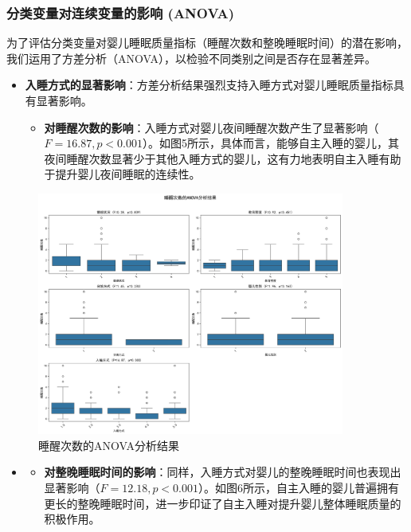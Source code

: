\documentclass[withoutpreface,bwprint]{cumcmthesis}
\begin{document}
\subsubsection{分类变量对连续变量的影响 (ANOVA)}
为了评估分类变量对婴儿睡眠质量指标（睡醒次数和整晚睡眠时间）的潜在影响，我们运用了方差分析（ANOVA），以检验不同类别之间是否存在显著差异。
\begin{itemize}
    \item \textbf{入睡方式的显著影响}：方差分析结果强烈支持入睡方式对婴儿睡眠质量指标具有显著影响。
    \begin{itemize}
        \item \textbf{对睡醒次数的影响}：入睡方式对婴儿夜间睡醒次数产生了显著影响（$F=16.87, p<0.001$）。如图5所示，具体而言，能够自主入睡的婴儿，其夜间睡醒次数显著少于其他入睡方式的婴儿，这有力地表明自主入睡有助于提升婴儿夜间睡眠的连续性。
    \end{itemize}
\end{itemize}

\begin{figure}[htbp]
    \centering
    \includegraphics[width=0.9\textwidth]{figures/anova_睡醒次数_combined.png}
    \caption{睡醒次数的ANOVA分析结果}
    \label{fig:anova_wake_up_times}
\end{figure}

\begin{itemize}
    \item[] %
    \begin{itemize}
        \item \textbf{对整晚睡眠时间的影响}：同样，入睡方式对婴儿的整晚睡眠时间也表现出显著影响（$F=12.18, p<0.001$）。如图6所示，自主入睡的婴儿普遍拥有更长的整晚睡眠时间，进一步印证了自主入睡对提升婴儿整体睡眠质量的积极作用。
    \end{itemize}
\end{itemize}
\end{document}
